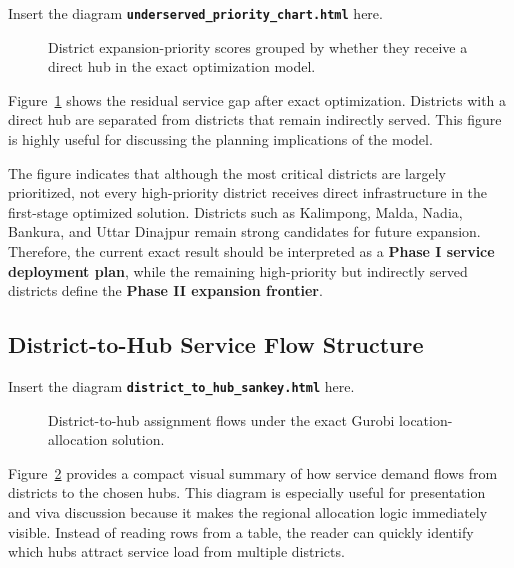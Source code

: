 Insert the diagram \textbf{\texttt{underserved\_priority\_chart.html}} here.

\begin{figure}[h!]
\centering
\caption{District expansion-priority scores grouped by whether they receive a direct hub in the exact optimization model.}
\label{fig:gurobi_underserved}
\end{figure}

Figure~\ref{fig:gurobi_underserved} shows the residual service gap after exact optimization. Districts with a direct hub are separated from districts that remain indirectly served. This figure is highly useful for discussing the planning implications of the model.

The figure indicates that although the most critical districts are largely prioritized, not every high-priority district receives direct infrastructure in the first-stage optimized solution. Districts such as Kalimpong, Malda, Nadia, Bankura, and Uttar Dinajpur remain strong candidates for future expansion. Therefore, the current exact result should be interpreted as a \textbf{Phase I service deployment plan}, while the remaining high-priority but indirectly served districts define the \textbf{Phase II expansion frontier}.

\subsection{District-to-Hub Service Flow Structure}

Insert the diagram \textbf{\texttt{district\_to\_hub\_sankey.html}} here.

\begin{figure}[h!]
\centering
\caption{District-to-hub assignment flows under the exact Gurobi location-allocation solution.}
\label{fig:gurobi_sankey}
\end{figure}

Figure~\ref{fig:gurobi_sankey} provides a compact visual summary of how service demand flows from districts to the chosen hubs. This diagram is especially useful for presentation and viva discussion because it makes the regional allocation logic immediately visible. Instead of reading rows from a table, the reader can quickly identify which hubs attract service load from multiple districts.

